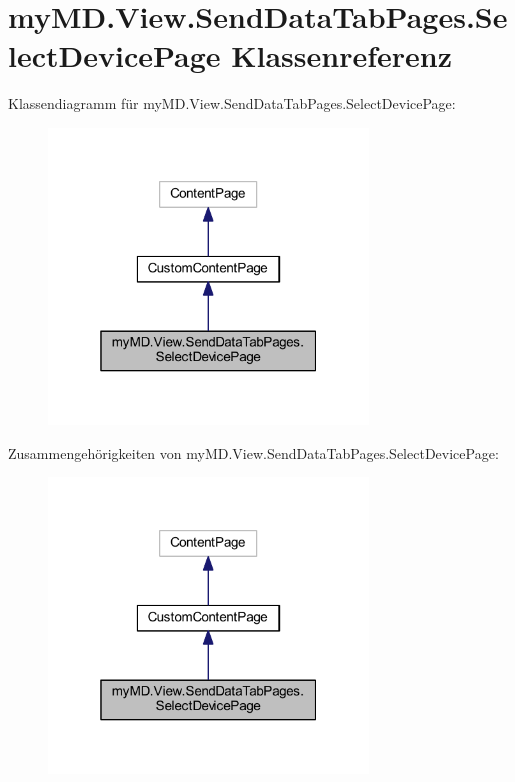 \hypertarget{classmy_m_d_1_1_view_1_1_send_data_tab_pages_1_1_select_device_page}{}\section{my\+M\+D.\+View.\+Send\+Data\+Tab\+Pages.\+Select\+Device\+Page Klassenreferenz}
\label{classmy_m_d_1_1_view_1_1_send_data_tab_pages_1_1_select_device_page}


Klassendiagramm für my\+M\+D.\+View.\+Send\+Data\+Tab\+Pages.\+Select\+Device\+Page\+:\nopagebreak
\begin{figure}[H]
\begin{center}
\leavevmode
\includegraphics[width=241pt]{classmy_m_d_1_1_view_1_1_send_data_tab_pages_1_1_select_device_page__inherit__graph}
\end{center}
\end{figure}


Zusammengehörigkeiten von my\+M\+D.\+View.\+Send\+Data\+Tab\+Pages.\+Select\+Device\+Page\+:\nopagebreak
\begin{figure}[H]
\begin{center}
\leavevmode
\includegraphics[width=241pt]{classmy_m_d_1_1_view_1_1_send_data_tab_pages_1_1_select_device_page__coll__graph}
\end{center}
\end{figure}
